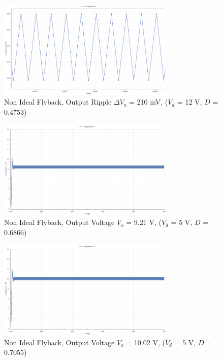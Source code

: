 \documentclass[12pt,twoside]{scrartcl}
\begin{document}
\begin{figure}[htp]
    \centering
    \includegraphics[width=0.75\textwidth]{RippleNonIdealSim12V.png}
    \caption{Non Ideal Flyback, Output Ripple $\Delta V_o$ = 210 mV, ($V_d$ = 12 V, $D$ = 0.4753)}
    \label{fig:RippleNonIdealSim12V}
\end{figure}
\begin{figure}[htp]
    \centering
    \includegraphics[width=0.75\textwidth]{NonIdealSim5V(calculated).png}
    \caption{Non Ideal Flyback, Output Voltage $V_o$ = 9.21 V, ($V_d$ = 5 V, $D$ = 0.6866)}
    \label{fig:NonIdealSim5Vcal}
\end{figure}

\begin{figure}[htp]
    \centering
    \includegraphics[width=0.75\textwidth]{NonIdealSim5V(tested).png}
    \caption{Non Ideal Flyback, Output Voltage $V_o$ = 10.02 V, ($V_d$ = 5 V, $D$ = 0.7055)}
    \label{fig:NonIdealSim5Vtested}
\end{figure}
\end{document}
